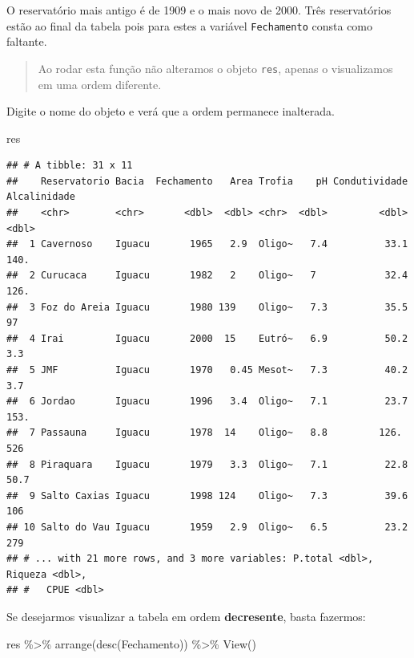 \documentclass[
]{book}
\newenvironment{Shaded}{\begin{snugshade}}{\end{snugshade}}
\newcommand{\FunctionTok}[1]{\textcolor[rgb]{0.00,0.00,0.00}{#1}}
\newcommand{\NormalTok}[1]{#1}
\newcommand{\SpecialCharTok}[1]{\textcolor[rgb]{0.00,0.00,0.00}{#1}}
\begin{document}
O reservatório mais antigo é de 1909 e o mais novo de 2000. Três reservatórios estão ao final da tabela pois para estes a variável \texttt{Fechamento} consta como faltante.

\begin{quote}
Ao rodar esta função não alteramos o objeto \texttt{res}, apenas o visualizamos em uma ordem diferente.
\end{quote}

Digite o nome do objeto e verá que a ordem permanece inalterada.

\begin{Shaded}
\begin{Highlighting}[]
\NormalTok{res}
\end{Highlighting}
\end{Shaded}

\begin{verbatim}
## # A tibble: 31 x 11
##    Reservatorio Bacia  Fechamento   Area Trofia    pH Condutividade Alcalinidade
##    <chr>        <chr>       <dbl>  <dbl> <chr>  <dbl>         <dbl>        <dbl>
##  1 Cavernoso    Iguacu       1965   2.9  Oligo~   7.4          33.1        140. 
##  2 Curucaca     Iguacu       1982   2    Oligo~   7            32.4        126. 
##  3 Foz do Areia Iguacu       1980 139    Oligo~   7.3          35.5         97  
##  4 Irai         Iguacu       2000  15    Eutró~   6.9          50.2          3.3
##  5 JMF          Iguacu       1970   0.45 Mesot~   7.3          40.2          3.7
##  6 Jordao       Iguacu       1996   3.4  Oligo~   7.1          23.7        153. 
##  7 Passauna     Iguacu       1978  14    Oligo~   8.8         126.         526  
##  8 Piraquara    Iguacu       1979   3.3  Oligo~   7.1          22.8         50.7
##  9 Salto Caxias Iguacu       1998 124    Oligo~   7.3          39.6        106  
## 10 Salto do Vau Iguacu       1959   2.9  Oligo~   6.5          23.2        279  
## # ... with 21 more rows, and 3 more variables: P.total <dbl>, Riqueza <dbl>,
## #   CPUE <dbl>
\end{verbatim}

Se desejarmos visualizar a tabela em ordem \textbf{decresente}, basta fazermos:

\begin{Shaded}
\begin{Highlighting}[]
\NormalTok{res }\SpecialCharTok{\%\textgreater{}\%} 
  \FunctionTok{arrange}\NormalTok{(}\FunctionTok{desc}\NormalTok{(Fechamento)) }\SpecialCharTok{\%\textgreater{}\%} 
  \FunctionTok{View}\NormalTok{()}
\end{Highlighting}
\end{Shaded}
\end{document}
